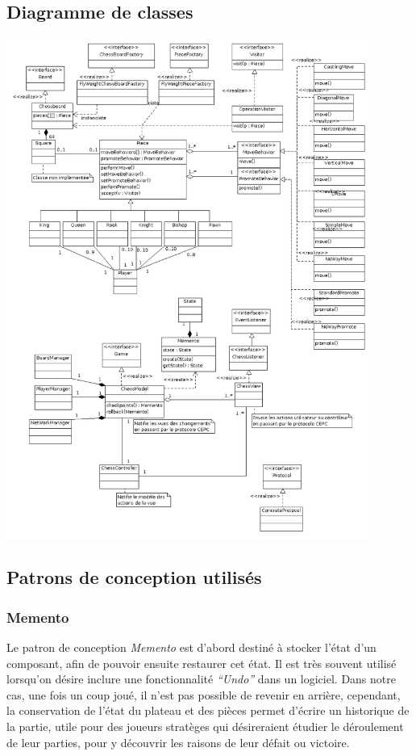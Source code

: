 \documentclass[11pt]{article}
\begin{document}
\subsection{Diagramme de classes}
\label{sec-3-2}
\includegraphics[width=0.9\textwidth]{Diagrammedeclasses.png}

\subsection{Patrons de conception utilisés}
\label{sec-3-3}
\subsubsection{Memento}
\label{sec-3-3-1}
Le patron de conception \emph{Memento} est d'abord destiné à stocker l'état d'un composant, afin de pouvoir ensuite restaurer cet état. Il est très souvent utilisé lorsqu'on désire inclure une fonctionnalité \emph{``Undo''} dans un logiciel. Dans notre cas, une fois un coup joué, il n'est pas possible de revenir en arrière, cependant, la conservation de l'état du plateau et des pièces permet d'écrire un historique de la partie, utile pour des joueurs stratèges qui désireraient étudier le déroulement de leur parties, pour y découvrir les raisons de leur défait ou victoire.
\end{document}
